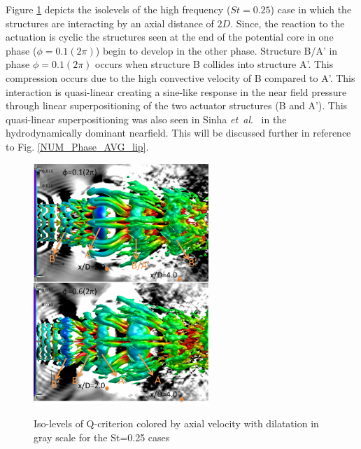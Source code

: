 \documentclass[english]{aiaa-tc}
\newcommand*{\etal}{\textit{et~al}.\ }
\begin{document}
Figure \ref{fig:isolevels} depicts the isolevels of the high frequency ($St=0.25$) case in which the structures are interacting by an axial distance of $2D$.
Since, the reaction to the actuation is cyclic the structures seen at the end of the potential core in one phase ($\phi=0.1(2\pi)$) begin to develop in the other phase. Structure B/A' in phase $\phi=0.1(2\pi)$ occurs when structure B collides into structure A'. This compression occurs due to the high convective velocity of B compared to A'. This interaction is quasi-linear creating a sine-like response in the near field pressure through linear superpositioning of the two actuator structures (B and A'). This quasi-linear superpositioning was also seen in Sinha \etal \cite{sinha2013} in the hydrodynamically dominant nearfield. This will be discussed further in reference to Fig. \ref{NUM_Phase_AVG_lip}.
\begin{figure}
\begin{center}
\begin{centering}
{\includegraphics[width=2.6in]{M09St025qcritphase0106AB}}
\end{centering}
\caption{Iso-levels of Q-criterion colored by axial velocity with dilatation in gray scale for the St=0.25 cases}
\label{fig:isolevels}
\end{center}
\end{figure}
\end{document}
